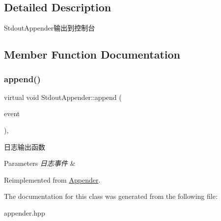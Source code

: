 \subsection{Detailed Description}
Stdout\+Appender输出到控制台 

\subsection{Member Function Documentation}
\mbox{\label{classStdoutAppender_aadfb0bdcef0b192bee7ccab70ee6502b}} 
\subsubsection{\texorpdfstring{append()}{append()}}
{\footnotesize\ttfamily virtual void Stdout\+Appender\+::append (\begin{DoxyParamCaption}\item[{Log\+Event\+::sptr}]{event }\end{DoxyParamCaption})\hspace{0.3cm}{\ttfamily [override]}, {\ttfamily [virtual]}}



日志输出函数 


\begin{DoxyParams}{Parameters}
{\em 日志事件} & \\
\hline
\end{DoxyParams}


Reimplemented from \hyperlink{classAppender_a3bfa17781e5b6102667725a5d23b394a}{Appender}.



The documentation for this class was generated from the following file\+:\begin{DoxyCompactItemize}
\item 
appender.\+hpp\end{DoxyCompactItemize}
